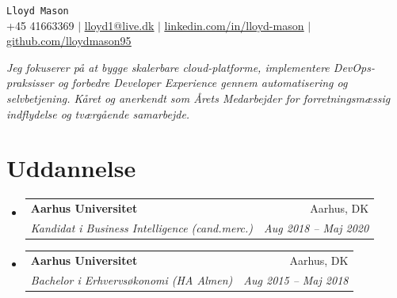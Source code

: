\documentclass[letterpaper,11pt]{article}
\makeatletter
\newcommand{\resumeSubheading}[4]{
  \vspace{-2pt}\item
    \begin{tabular*}{0.97\textwidth}[t]{l@{\extracolsep{\fill}}r}
      \textbf{#1} & #2 \\
      \textit{\small#3} & \textit{\small #4} \\
    \end{tabular*}\vspace{-7pt}
}
\newcommand{\resumeSubHeadingListStart}{\begin{itemize}[leftmargin=0.15in, label={}]}
\newcommand{\resumeSubHeadingListEnd}{\end{itemize}}
\makeatother
\begin{document}
\begin{center}
    {\Huge \texttt{Lloyd Mason}} \\ \vspace{1pt}
    \small +45 41663369 $|$ \href{mailto:lloyd1@live.dk}{\underline{lloyd1@live.dk}} $|$ 
    \href{https://linkedin.com/in/lloyd-mason}{\underline{linkedin.com/in/lloyd-mason}} $|$
    \href{https://github.com/lloydmason95}{\underline{github.com/lloydmason95}}
\end{center}

\vspace{5pt}
\begin{center}
    \small \textit{Jeg fokuserer på at bygge skalerbare cloud-platforme, implementere DevOps-praksisser og forbedre Developer Experience gennem automatisering og selvbetjening. Kåret og anerkendt som Årets Medarbejder for forretningsmæssig indflydelse og tværgående samarbejde.}
\end{center}
\vspace{5pt}

\section{Uddannelse}
  \resumeSubHeadingListStart
    \resumeSubheading
      {Aarhus Universitet}{Aarhus, DK}
      {Kandidat i Business Intelligence (cand.merc.)}{Aug 2018 -- Maj 2020}
    \resumeSubheading
      {Aarhus Universitet}{Aarhus, DK}
      {Bachelor i Erhvervsøkonomi (HA Almen)}{Aug 2015 -- Maj 2018}
  \resumeSubHeadingListEnd

\end{document}
